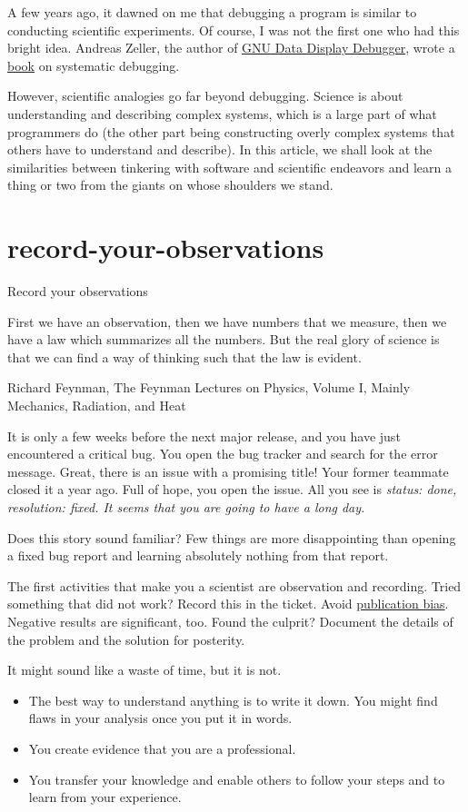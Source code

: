 \documentclass{article}
\begin{document}
A few years ago, it dawned on me that debugging a program is similar to conducting scientific experiments.
Of course, I was not the first one who had this bright idea.
Andreas Zeller, the author of \href{https://www.gnu.org/software/ddd/ddd.html}{GNU Data Display Debugger}, wrote a \href{https://www.whyprogramsfail.com/}{book} on systematic debugging.

However, scientific analogies go far beyond debugging.
Science is about understanding and describing complex systems, which is a large part of what programmers do (the other part being constructing overly complex systems that others have to understand and describe).
In this article, we shall look at the similarities between tinkering with software and scientific endeavors and learn a thing or two from the giants on whose shoulders we stand.

\section{record-your-observations}{Record your observations}
\epigraph{
  First we have an observation, then we have numbers that we measure, then we have a law which summarizes all the numbers.
  But the real glory of science is that we can find a way of thinking such that the law is evident.
}{Richard Feynman, The Feynman Lectures on Physics, Volume I, Mainly Mechanics, Radiation, and Heat}

It is only a few weeks before the next major release, and you have just encountered a critical bug.
You open the bug tracker and search for the error message.
Great, there is an issue with a promising title!
Your former teammate closed it a year ago.
Full of hope, you open the issue.
All you see is \em{status: done, resolution: fixed}.
It seems that you are going to have a long day.

Does this story sound familiar?
Few things are more disappointing than opening a fixed bug report and learning absolutely nothing from that report.

The first activities that make you a scientist are observation and recording.
Tried something that did not work?
Record this in the ticket.
Avoid \href{https://en.wikipedia.org/wiki/Publication_bias}{publication bias}.
Negative results are significant, too.
Found the culprit?
Document the details of the problem and the solution for posterity.

It might sound like a waste of time, but it is not.

\begin{itemize}
  \item 
    The best way to understand anything is to write it down.
    You might find flaws in your analysis once you put it in words.
  \item You create evidence that you are a professional.
  \item You transfer your knowledge and enable others to follow your steps and to learn from your experience.
\end{itemize}
\end{document}
